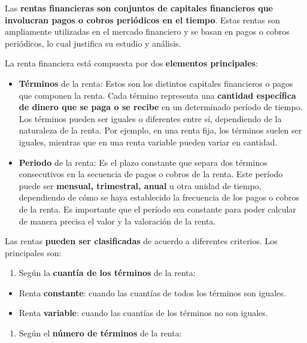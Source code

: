 \documentclass[
  letterpaper,
  DIV=11,
  numbers=noendperiod]{scrartcl}
\providecommand{\tightlist}{%
  \setlength{\itemsep}{0pt}\setlength{\parskip}{0pt}}\usepackage{longtable,booktabs,array}
\begin{document}
Las \textbf{rentas financieras son conjuntos de capitales financieros
que involucran pagos o cobros periódicos en el tiempo}. Estas rentas son
ampliamente utilizadas en el mercado financiero y se basan en pagos o
cobros periódicos, lo cual justifica su estudio y análisis.

La renta financiera está compuesta por dos \textbf{elementos
principales}:

\begin{itemize}
\item
  \textbf{Términos} de la renta: Estos son los distintos capitales
  financieros o pagos que componen la renta. Cada término representa una
  \textbf{cantidad específica de dinero que se paga o se recibe} en un
  determinado período de tiempo. Los términos pueden ser iguales o
  diferentes entre sí, dependiendo de la naturaleza de la renta. Por
  ejemplo, en una renta fija, los términos suelen ser iguales, mientras
  que en una renta variable pueden variar en cantidad.
\item
  \textbf{Periodo} de la renta: Es el plazo constante que separa dos
  términos consecutivos en la secuencia de pagos o cobros de la renta.
  Este período puede ser \textbf{mensual, trimestral, anual} u otra
  unidad de tiempo, dependiendo de cómo se haya establecido la
  frecuencia de los pagos o cobros de la renta. Es importante que el
  período sea constante para poder calcular de manera precisa el valor y
  la valoración de la renta.
\end{itemize}

Las rentas \textbf{pueden ser clasificadas} de acuerdo a diferentes
criterios. Los principales son:

\begin{enumerate}
\def\labelenumi{\arabic{enumi}.}
\tightlist
\item
  Según la \textbf{cuantía de los términos} de la renta:
\end{enumerate}

\begin{itemize}
\tightlist
\item
  Renta \textbf{constante}: cuando las cuantías de todos los términos
  son iguales.
\item
  Renta \textbf{variable}: cuando las cuantías de los términos no son
  iguales.
\end{itemize}

\begin{enumerate}
\def\labelenumi{\arabic{enumi}.}
\setcounter{enumi}{1}
\tightlist
\item
  Según el \textbf{número de términos} de la renta:
\end{enumerate}
\end{document}
